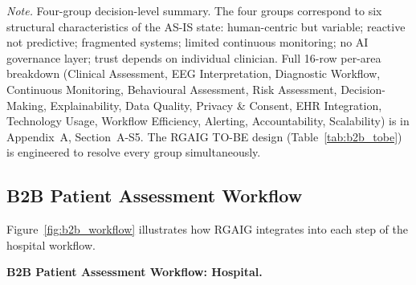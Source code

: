 \vspace{0.4em}
\noindent\textit{Note.} Four-group decision-level summary. The four groups correspond to six structural characteristics of the AS-IS state: human-centric but variable; reactive not predictive; fragmented systems; limited continuous monitoring; no AI governance layer; trust depends on individual clinician. Full 16-row per-area breakdown (Clinical Assessment, EEG Interpretation, Diagnostic Workflow, Continuous Monitoring, Behavioural Assessment, Risk Assessment, Decision-Making, Explainability, Data Quality, Privacy \& Consent, EHR Integration, Technology Usage, Workflow Efficiency, Alerting, Accountability, Scalability) is in Appendix~A, Section~A-S5. The RGAIG TO-BE design (Table~\ref{tab:b2b_tobe}) is engineered to resolve every group simultaneously.


\subsection{B2B Patient Assessment Workflow}
\label{sec:b2b_assessment_workflow}

Figure~\ref{fig:b2b_workflow} illustrates how RGAIG integrates into each step of the hospital workflow.
\label{tab:b2b_assessment_workflow}


\noindent\textbf{B2B Patient Assessment Workflow: Hospital.}

